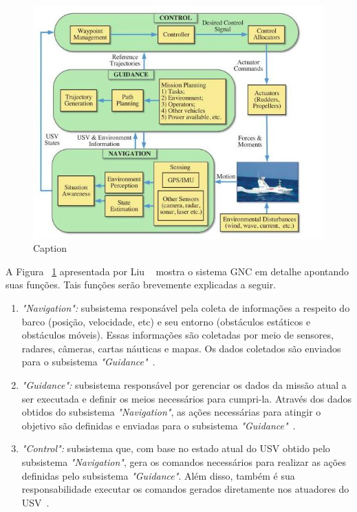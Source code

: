         \begin{figure}
            \centering
            \includegraphics[width=\textwidth]{fig/gnc_system.png}
            \caption{Caption}
            \label{fig:gnc_system}
        \end{figure}
    
        A Figura ~\ref{fig:gnc_system} apresentada por Liu \etal~\cite{LIU201671} mostra o sistema GNC em detalhe apontando suas funções. Tais funções serão brevemente explicadas a seguir.
        
        \begin{enumerate}
            \item \textit{"Navigation":} subsistema responsável pela coleta de informações a respeito do barco (posição, velocidade, etc) e seu entorno (obstáculos estáticos e obstáculos móveis). Essas informações são coletadas por meio de sensores, radares, câmeras, cartas náuticas e mapas. Os dados coletados são enviados para o subsistema \textit{"Guidance"}~\cite{JURAK2020}.
            
            \item \textit{"Guidance":} subsistema responsável por gerenciar os dados da missão atual a ser executada e definir os meios necessários para cumpri-la. Através dos dados obtidos do subsistema \textit{"Navigation"}, as ações necessárias para atingir o objetivo são definidas e enviadas para o subsistema \textit{"Guidance"}~\cite{JURAK2020}.
            
            \item \textit{"Control":} subsistema que, com base no estado atual do USV obtido pelo subsistema \textit{"Navigation"}, gera os comandos necessários para realizar as ações definidas pelo subsistema \textit{"Guidance"}. Além disso, também é sua responsabilidade executar os comandos gerados diretamente nos atuadores do USV~\cite{JURAK2020}.
        \end{enumerate}
        
